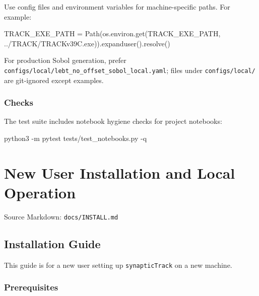 \documentclass[
]{article}
\newenvironment{Shaded}{}{}
\newcommand{\AttributeTok}[1]{\textcolor[rgb]{0.49,0.56,0.16}{#1}}
\newcommand{\ExtensionTok}[1]{#1}
\newcommand{\NormalTok}[1]{#1}
\newcommand{\OperatorTok}[1]{\textcolor[rgb]{0.40,0.40,0.40}{#1}}
\newcommand{\StringTok}[1]{\textcolor[rgb]{0.25,0.44,0.63}{#1}}
\begin{document}
Use config files and environment variables for machine-specific paths.
For example:

\begin{Shaded}
\begin{Highlighting}[]
\NormalTok{TRACK\_EXE\_PATH }\OperatorTok{=}\NormalTok{ Path(os.environ.get(}\StringTok{\textquotesingle{}TRACK\_EXE\_PATH\textquotesingle{}}\NormalTok{, }\StringTok{\textquotesingle{}../TRACK/TRACKv39C.exe\textquotesingle{}}\NormalTok{)).expanduser().resolve()}
\end{Highlighting}
\end{Shaded}

For production Sobol generation, prefer
\texttt{configs/local/lebt\_no\_offset\_sobol\_local.yaml}; files under
\texttt{configs/local/} are git-ignored except examples.

\hypertarget{checks}{%
\subsubsection{Checks}\label{checks}}

The test suite includes notebook hygiene checks for project notebooks:

\begin{Shaded}
\begin{Highlighting}[]
\ExtensionTok{python3} \AttributeTok{{-}m}\NormalTok{ pytest tests/test\_notebooks.py }\AttributeTok{{-}q}
\end{Highlighting}
\end{Shaded}

\hypertarget{new-user-installation-and-local-operation}{%
\section{New User Installation and Local
Operation}\label{new-user-installation-and-local-operation}}

Source Markdown: \texttt{docs/INSTALL.md}

\hypertarget{installation-guide}{%
\subsection{Installation Guide}\label{installation-guide}}

This guide is for a new user setting up \texttt{synapticTrack} on a new
machine.

\hypertarget{prerequisites}{%
\subsubsection{Prerequisites}\label{prerequisites}}
\end{document}
